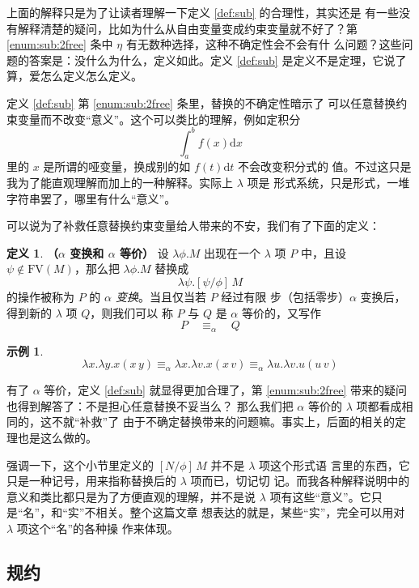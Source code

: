 \documentclass[a4paper,adobefonts]{ctexart}
\theoremstyle{definition}
\newtheorem{definition}{定义}
\newtheorem{example}{示例}
\begin{document}
上面的解释只是为了让读者理解一下定义 \ref{def:sub} 的合理性，其实还是
有一些没有解释清楚的疑问，比如为什么从自由变量变成约束变量就不好了？第
\ref{enum:sub:2free} 条中 $\eta$ 有无数种选择，这种不确定性会不会有什
么问题？这些问题的答案是：没什么为什么，定义如此。定义 \ref{def:sub}
是定义不是定理，它说了算，爱怎么定义怎么定义。

定义 \ref{def:sub} 第 \ref{enum:sub:2free} 条里，替换的不确定性暗示了
可以任意替换约束变量而不改变``意义''。这个可以类比的理解，例如定积分
$$
\int_a^bf(x)\text{d}x
$$里的 $x$ 是所谓的哑变量，换成别的如 $f(t)\text{d}t$ 不会改变积分式的
值。不过这只是我为了能直观理解而加上的一种解释。实际上 $\lambda$ 项是
形式系统，只是形式，一堆字符串罢了，哪里有什么``意义''。

可以说为了补救任意替换约束变量给人带来的不安，我们有了下面的定义：

\begin{definition}{\bfseries{（$\alpha$ 变换和 $\alpha$ 等价）}}
  设 $\lambda\phi.M$ 出现在一个 $\lambda$ 项 $P$ 中，且设
  $\psi\not\in\text{FV}(M)$，那么把 $\lambda\phi.M$ 替换成
  $$
  \lambda\psi.[\psi/\phi]\,M
  $$的操作被称为 $P$ 的 \emph{$\alpha$ 变换}。当且仅当若 $P$ 经过有限
  步（包括零步）$\alpha$ 变换后，得到新的 $\lambda$ 项 $Q$，则我们可以
  称 $P$ 与 $Q$ 是 $\alpha$ 等价的，又写作
             $$ P\quad\equiv_\alpha\quad Q
             $$
\end{definition}

\begin{example}
  $$
  \lambda x.\lambda y.x(x\,y) \equiv_\alpha\lambda x.\lambda v.x(x\,v) \equiv_\alpha\lambda u.\lambda v.u(u\,v)
  $$
\end{example}

有了 $\alpha$ 等价，定义 \ref{def:sub} 就显得更加合理了，第
\ref{enum:sub:2free} 带来的疑问也得到解答了：不是担心任意替换不妥当么？
那么我们把 $\alpha$ 等价的 $\lambda$ 项都看成相同的，这不就``补救''了
由于不确定替换带来的问题嘛。事实上，后面的相关的定理也是这么做的。

强调一下，这个小节里定义的 $[N/\phi]\,M$ 并不是 $\lambda$ 项这个形式语
言里的东西，它只是一种记号，用来指称替换后的 $\lambda$ 项而已，切记切
记。而我各种解释说明中的意义和类比都只是为了方便直观的理解，并不是说
$\lambda$ 项有这些``意义''。它只是``名''，和``实''不相关。整个这篇文章
想表达的就是，某些``实''，完全可以用对 $\lambda$ 项这个``名''的各种操
作来体现。

\subsection{规约}
\end{document}
